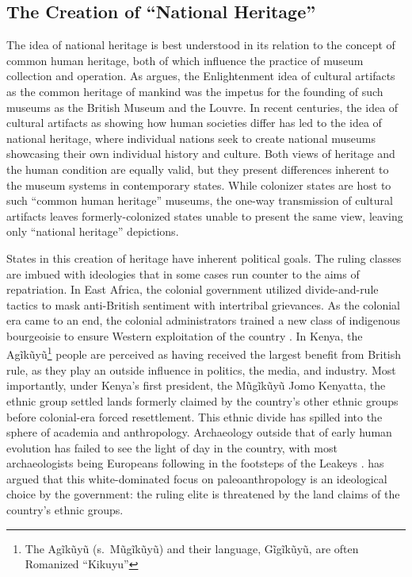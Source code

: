 \documentclass[american]{../../../coursework}
\begin{document}
\subsection{The Creation of ``National Heritage''}

The idea of national heritage is best understood in its relation to the
concept of common human heritage, both of which influence the practice of
museum collection and operation. As \textcite{Tur09} argues, the Enlightenment
idea of cultural artifacts as the common heritage of mankind was the impetus
for the founding of such museums as the British Museum  and the Louvre. In
recent centuries, the idea of cultural artifacts as showing how human
societies differ has led to the idea of national heritage, where individual
nations seek to create national museums showcasing their own individual
history and culture. Both views of heritage and the human condition are
equally valid, but they present differences inherent to the museum systems in
contemporary states. While colonizer states are host to such ``common human
heritage'' museums, the one-way transmission of cultural artifacts
\parencite{Kup14} leaves formerly-colonized states unable to present the same
view, leaving only ``national heritage'' depictions.

States in this creation of heritage have inherent political goals. The ruling
classes are imbued with ideologies that in some cases run counter to the aims
of repatriation. In East Africa, the colonial government utilized
divide-and-rule tactics to mask anti-British sentiment with intertribal
grievances. As the colonial era came to an end, the colonial administrators
trained a new class of indigenous bourgeoisie to ensure Western exploitation
of the country \parencite{Mut79}. In Kenya, the Agĩkũyũ\footnote{The Agĩkũyũ
(s.\ Mũgĩkũyũ) and their language, Gĩgĩkũyũ, are often Romanized ``Kikuyu''}
people are perceived as having received the largest benefit from British rule,
as they play an outside influence in politics, the media, and industry. Most
importantly, under Kenya's first president, the Mũgĩkũyũ Jomo Kenyatta, the
ethnic group settled lands formerly claimed by the country's other ethnic
groups before colonial-era forced resettlement. This ethnic divide has spilled
into the sphere of academia and anthropology. Archaeology outside that of
early human evolution has failed to see the light of day in the country, with
most archaeologists being Europeans following in the footsteps of the Leakeys
\parencite{Kof97}. \textcite{Sch95} has argued that this white-dominated focus
on paleoanthropology is an ideological choice by the government: the ruling
elite is threatened by the land claims of the country's ethnic groups.
\end{document}
